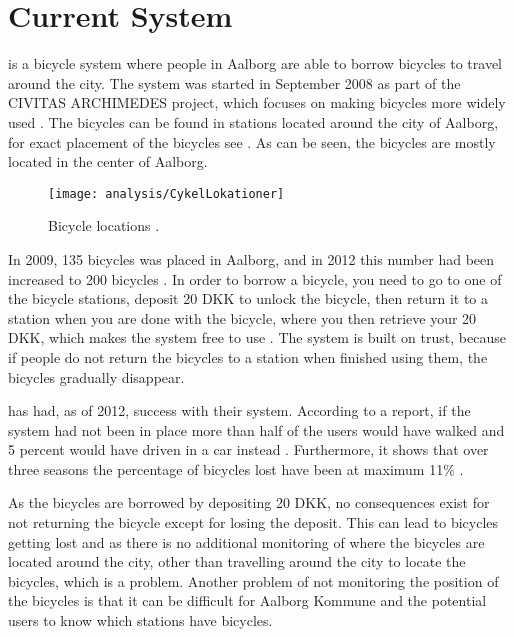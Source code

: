 \section{Current System}\label{sec:currentsystem}


\bycykel is a bicycle system where people in Aalborg are able to borrow bicycles to travel around the city.
The system was started in September 2008 as part of the CIVITAS ARCHIMEDES project, which focuses on making bicycles more widely used \citep{misc:aalborgcykling}.
The bicycles can be found in stations located around the city of Aalborg, for exact placement of the bicycles see .
As can be seen, the bicycles are mostly located in the center of Aalborg.

\begin{figure}[h]
	\centering
	\texttt{[image: analysis/CykelLokationer]}
	\caption{Bicycle locations \citep{misc:aalborgbycykel}.}
	\label{fig:CykelLokationer}
\end{figure}

In 2009, 135 bicycles was placed in Aalborg, and in 2012 this number had been increased to 200 bicycles \citep{misc:aalborgcykling}.
In order to borrow a bicycle, you need to go to one of the bicycle stations, deposit 20 DKK to unlock the bicycle, then return it to a station when you are done with the bicycle, where you then retrieve your 20 DKK, which makes the system free to use \citep{misc:aalborgbycykelregler}.
The system is built on trust, because if people do not return the bicycles to a station when finished using them, the bicycles gradually disappear.

\bycykel has had, as of 2012, success with their system. 
According to a report, if the system had not been in place more than half of the users would have walked and 5 percent would have driven in a car instead \citep{misc:aalborgcykling}.
Furthermore, it shows that over three seasons the percentage of bicycles lost have been at maximum 11\% \citep{misc:aalborgcykling}.

As the bicycles are borrowed by depositing 20 DKK, no consequences exist for not returning the bicycle except for losing the deposit.
This can lead to bicycles getting lost and as there is no additional monitoring of where the bicycles are located around the city, other than travelling around the city to locate the bicycles, which is a problem.
Another problem of not monitoring the position of the bicycles is that it can be difficult for Aalborg Kommune and the potential users to know which stations have bicycles.

